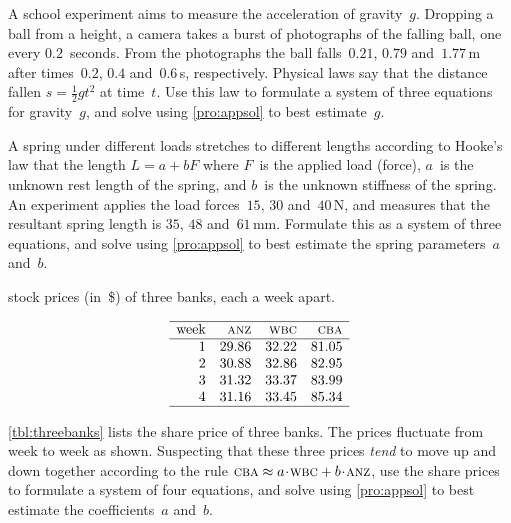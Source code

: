 \begin{exercise}  
A school experiment aims to measure the acceleration of gravity~\(g\).
Dropping a ball from a height, a camera takes a burst of photographs of the falling ball, one every \(0.2\)~seconds.
From the photographs the ball falls~\(0.21\), \(0.79\) and~\(1.77\)\,m after times~\(0.2\), \(0.4\) and~\(0.6\)\,s, respectively.
Physical laws say that the distance fallen \(s=\tfrac12gt^2\) at time~\(t\).
Use this law to formulate a system of three equations for gravity~\(g\), and solve using \autoref{pro:appsol} to best estimate~\(g\).
\end{exercise}


\begin{exercise}  
A spring under different loads stretches to different lengths according to Hooke's law that the length \(L=a+bF\) where \(F\)~is the applied load (force), \(a\)~is the unknown rest length of the spring, and \(b\)~is the unknown stiffness of the spring.
An experiment applies the load forces~\(15\), \(30\) and~\(40\)\,N, and measures that the resultant spring length is \(35\), \(48\) and~\(61\)\,mm.
Formulate this as a system of three equations, and solve using \autoref{pro:appsol} to best estimate the spring parameters~\(a\) and~\(b\).
\end{exercise}


\begin{exercise}  
\begin{table}
\caption{stock prices (in~\$) of three banks, each a week apart.}
\label{tbl:threebanks}
\begin{equation*}
\begin{array}{rrrr}
\hline
\text{week}&\textsc{anz}&\textsc{wbc}&\textsc{cba}
\\\hline
1&29.86&32.22&81.05\\
2&30.88&32.86&82.95\\
3&31.32&33.37&83.99\\
4&31.16&33.45&85.34\\
\hline
\end{array}
\end{equation*}
\end{table}
\autoref{tbl:threebanks} lists the share price of three banks. 
The prices fluctuate from week to week as shown.
Suspecting that these three prices \emph{tend} to move up and down together according to the rule \(\textsc{cba}\approx a\cdot\textsc{wbc}+b\cdot\textsc{anz}\), use the share prices to formulate a system of four equations, and solve using \autoref{pro:appsol} to best estimate the coefficients~\(a\) and~\(b\).
\end{exercise}






